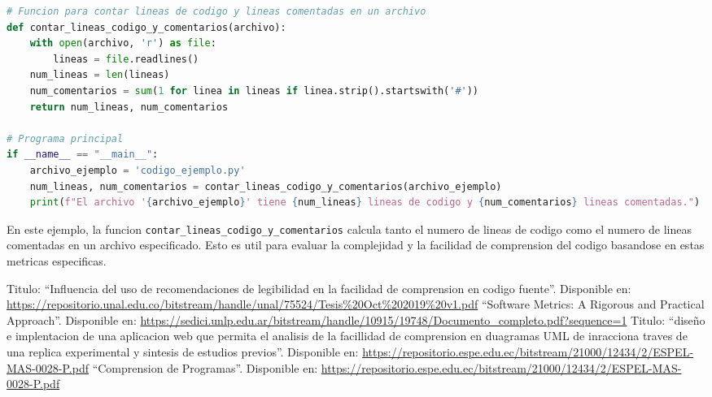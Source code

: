 \documentclass{article}
\begin{document}
\begin{lstlisting}[language=Python, caption=Ejemplo de calculo del numero de lineas de codigo y lineas comentadas en Python]
# Funcion para contar lineas de codigo y lineas comentadas en un archivo
def contar_lineas_codigo_y_comentarios(archivo):
    with open(archivo, 'r') as file:
        lineas = file.readlines()
    num_lineas = len(lineas)
    num_comentarios = sum(1 for linea in lineas if linea.strip().startswith('#'))
    return num_lineas, num_comentarios

# Programa principal
if __name__ == "__main__":
    archivo_ejemplo = 'codigo_ejemplo.py'
    num_lineas, num_comentarios = contar_lineas_codigo_y_comentarios(archivo_ejemplo)
    print(f"El archivo '{archivo_ejemplo}' tiene {num_lineas} lineas de codigo y {num_comentarios} lineas comentadas.")
\end{lstlisting}

En este ejemplo, la funcion \lstinline{contar_lineas_codigo_y_comentarios} calcula tanto el numero de lineas de codigo como el numero de lineas comentadas en un archivo especificado. Esto es util para evaluar la complejidad y la facilidad de comprension del codigo basandose en estas metricas especificas.

\begin{thebibliography}{99}
 Titulo: ``Influencia del uso de recomendaciones de legibilidad en la facilidad de comprension en codigo fuente''. Disponible en: \url{https://repositorio.unal.edu.co/bitstream/handle/unal/75524/Tesis%20Oct%202019%20v1.pdf}
 ``Software Metrics: A Rigorous and Practical Approach''. Disponible en: \url{https://sedici.unlp.edu.ar/bitstream/handle/10915/19748/Documento_completo.pdf?sequence=1}
 Titulo: ``diseño e implentacion de una aplicacion web que permita el analisis de la facillidad de comprension en duagramas UML de inracciona traves de una replica experimental y sintesis de estudios previos''. Disponible en: \url{https://repositorio.espe.edu.ec/bitstream/21000/12434/2/ESPEL-MAS-0028-P.pdf}
 ``Comprension de Programas''. Disponible en: \url{https://repositorio.espe.edu.ec/bitstream/21000/12434/2/ESPEL-MAS-0028-P.pdf}
\end{thebibliography}
\end{document}

